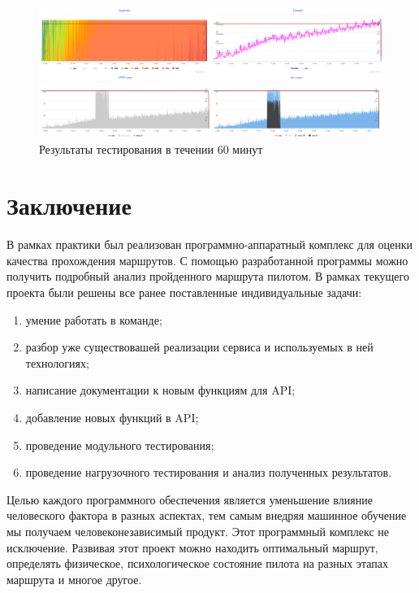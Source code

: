 \documentclass[a4paper, 10pt]{article}
\begin{document}
\begin{enumerate}
		\clearpage
		\newpage
		\begin{figure}[h!]
			\centering
			\includegraphics[scale=0.4]{60min}
			\centering\caption{Результаты тестирования в течении 60 минут}
		\end{figure}
	\end{enumerate}
	\clearpage
	\newpage
	\section*{Заключение}
	\hspace*{5mm}В рамках практики был реализован программно-аппаратный комплекс для оценки качества прохождения маршрутов. С помощью разработанной программы можно получить подробный анализ пройденного маршрута пилотом. В рамках текущего проекта были решены все ранее поставленные индивидуальные задачи: 
	 \begin{enumerate}
		\item умение работать в команде;
		\item разбор уже существовашей реализации сервиса и используемых в ней технологиях;
		\item написание документации к новым функциям для API;
		\item добавление новых функций в API;
		\item проведение модульного тестирования;
		\item проведение нагрузочного тестирования и анализ полученных результатов.
	\end{enumerate}
	\hspace*{5mm}Целью каждого программного обеспечения является уменьшение влияние человеского фактора в разных аспектах, тем самым внедряя машинное обучение мы получаем человеконезависимый продукт. Этот программный комплекс не исключение. Развивая этот проект можно находить оптимальный маршрут, определять физическое, психологическое состояние пилота на разных этапах маршрута и многое другое. 
	   
\end{document}
